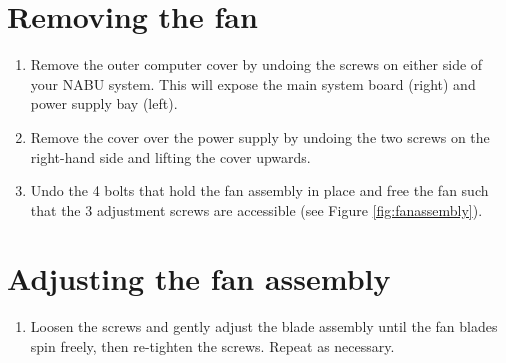 \section{Removing the fan}
\begin{enumerate}
	\item Remove the outer computer cover by undoing the screws on either side of your NABU system. This will expose the main system board (right) and power supply bay (left).
	\item Remove the cover over the power supply by undoing the two screws on the right-hand side and lifting the cover upwards.
	\item Undo the 4 bolts that hold the fan assembly in place and free the fan such that the 3 adjustment screws are accessible (see Figure \ref{fig:fanassembly}).
\end{enumerate}
\section{Adjusting the fan assembly}
\begin{enumerate}
	\item Loosen the screws and gently adjust the blade assembly until the fan blades spin freely, then re-tighten the screws. Repeat as necessary.
\end{enumerate}
